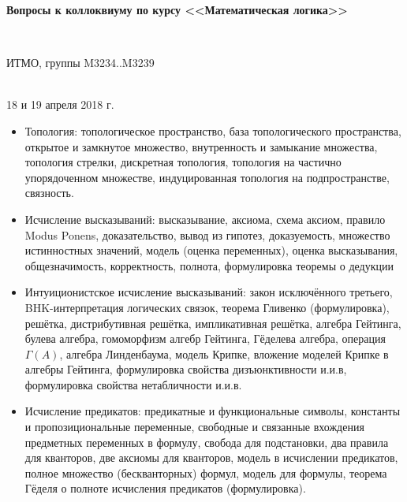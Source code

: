 \documentclass[11pt,a4paper,oneside]{article}
\begin{document}
\begin{center}
\begin{Large}{\bfseries Вопросы к коллоквиуму по курсу <<Математическая логика>>}\end{Large}\\
\vspace{1mm}
\begin{small} ИТМО, группы M3234..M3239\end{small}\\
\small 18 и 19 апреля 2018 г.
\end{center}

\begin{itemize}
\item Топология: топологическое пространство, база топологического пространства, 
открытое и замкнутое множество, внутренность и замыкание множества, топология стрелки,
дискретная топология, топология на частично упорядоченном множестве,
индуцированная топология на подпространстве, связность.
\item Исчисление высказываний: высказывание, аксиома,
схема аксиом, правило Modus Ponens, доказательство,
вывод из гипотез, доказуемость, 
множество истинностных значений, модель (оценка переменных), оценка высказывания, общезначимость, 
корректность, полнота, формулировка теоремы о дедукции
\item Интуиционистское исчисление высказываний: 
закон исключённого третьего, BHK-интерпретация логических связок, теорема Гливенко (формулировка),
решётка, дистрибутивная решётка, импликативная решётка, 
алгебра Гейтинга, булева алгебра, гомоморфизм алгебр Гейтинга,
Гёделева алгебра, операция $\Gamma(A)$, алгебра Линденбаума,
модель Крипке, вложение моделей Крипке в алгебры Гейтинга,
формулировка свойства дизъюнктивности и.и.в, формулировка свойства нетабличности и.и.в.
\item Исчисление предикатов:
предикатные и функциональные символы, константы и пропозициональные переменные,
свободные и связанные вхождения предметных переменных в формулу, 
свобода для подстановки, два правила для кванторов, две аксиомы для кванторов,
модель в исчислении предикатов, полное множество (бескванторных) формул, 
модель для формулы, теорема Гёделя о полноте исчисления предикатов (формулировка).
\end{itemize}
\end{document}
